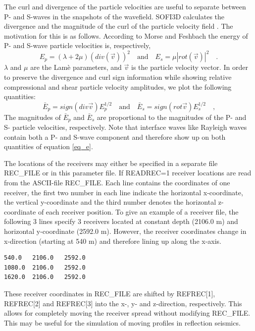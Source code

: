 \documentclass[11pt,onecolumn,oneside]{article}
\begin{document}
The curl and divergence of the particle velocities are useful to separate between P- and S-waves in the snapshots of the wavefield. SOFI3D calculates the divergence and the magnitude of the curl of the particle velocity field \cite{dougherty:88}. The motivation for this is as follows. According to Morse and Feshbach  the energy of P- and S-wave particle velocities is, respectively,
\begin{equation}
E_p=\left(\lambda + 2 \mu\right) (div(\vec{v}))^2 \quad \mbox{and} \quad E_s=\mu \left|rot(\vec{v})\right|^2 \quad\mbox{.}
\label{eq_E}
\end{equation}
$\lambda$ and $\mu$ are the Lam\`{e} parameters, and $\vec{v}$ is the particle velocity vector. In order to preserve the divergence and curl sign information  while showing relative compressional
and shear particle velocity amplitudes, we plot the following quantities:
\begin{equation}
\bar{E}_p=sign(div \vec{v}) E_p^{1/2} \quad \mbox{and} \quad \bar{E}_s= sign(rot\vec{v}) E_s^{1/2} \quad\mbox{,}
\label{eq_e}
\end{equation}
The magnitudes of $\bar{E}_p$ and $\bar{E}_s$ are proportional to the magnitudes of the P- and S- particle velocities, respectively. Note that interface waves like Rayleigh waves contain both a P- and S-wave component and therefore show up on both quantities of equation \ref{eq_e}.

The locations of the receivers may either be specified in a separate file REC\_FILE or in this parameter file. If READREC=1 receiver locations are read from the ASCII-file REC\_FILE. Each line contains the coordinates of one receiver, the first two number in each line indicate the horizontal x-coordinate, the vertical y-coordinate and the third number denotes the horizontal z-coordinate of each receiver position. To give an example of a receiver file, the following 3 lines specify 3 receivers located at constant depth (2106.0 m) and horizontal y-coordinate (2592.0 m). However, the receiver coordinates change in x-direction (starting at 540 m) and therefore lining up along the x-axis.  
\begin{verbatim}
540.0   2106.0   2592.0   
1080.0  2106.0   2592.0
1620.0  2106.0   2592.0
\end{verbatim}
These receiver coordinates in REC\_FILE are shifted by REFREC[1], REFREC[2] and REFREC[3] into the  x-, y- and z-direction, respectively. This allows for completely moving the receiver spread without modifying REC\_FILE. This may be useful for the simulation of moving profiles in reflection seismics.
\end{document}
